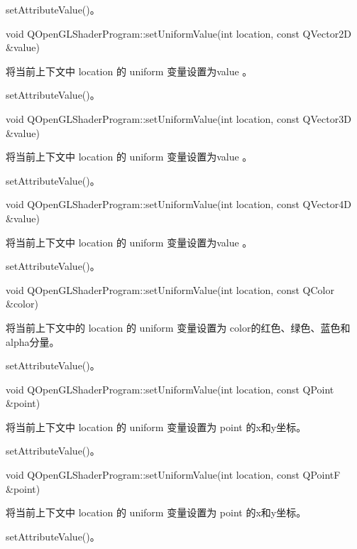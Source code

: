 \begin{seeAlso}
setAttributeValue()。
\end{seeAlso}

void QOpenGLShaderProgram::setUniformValue(int location, const QVector2D \&value)

将当前上下文中 location 的 uniform 变量设置为value 。


\begin{seeAlso}
setAttributeValue()。
\end{seeAlso}

void QOpenGLShaderProgram::setUniformValue(int location, const QVector3D \&value)

将当前上下文中 location 的 uniform 变量设置为value 。


\begin{seeAlso}
setAttributeValue()。
\end{seeAlso}

void QOpenGLShaderProgram::setUniformValue(int location, const QVector4D \&value)

将当前上下文中 location 的 uniform 变量设置为value 。


\begin{seeAlso}
setAttributeValue()。
\end{seeAlso}

void QOpenGLShaderProgram::setUniformValue(int location, const QColor \&color)

将当前上下文中的 location 的 uniform 变量设置为 color的红色、绿色、蓝色和alpha分量。



\begin{seeAlso}
setAttributeValue()。
\end{seeAlso}

void QOpenGLShaderProgram::setUniformValue(int location, const QPoint \&point)

将当前上下文中 location 的 uniform 变量设置为 point 的x和y坐标。


\begin{seeAlso}
setAttributeValue()。
\end{seeAlso}

void QOpenGLShaderProgram::setUniformValue(int location, const QPointF \&point)


将当前上下文中 location 的 uniform 变量设置为 point 的x和y坐标。


\begin{seeAlso}
setAttributeValue()。
\end{seeAlso}

